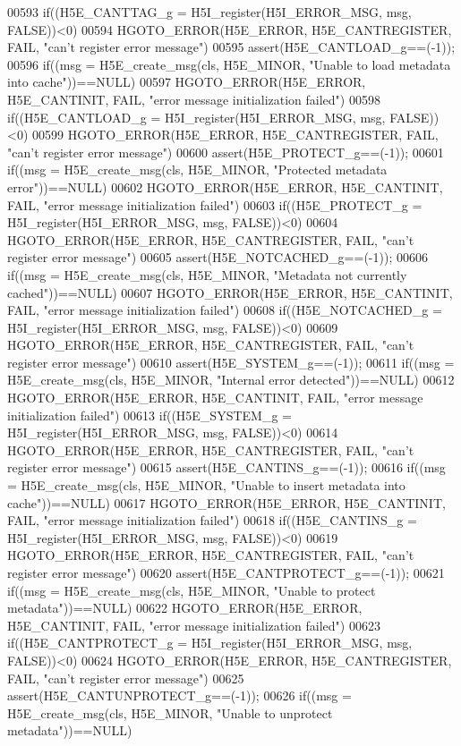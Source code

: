 \begin{DoxyCode}
00593 if((H5E\_CANTTAG\_g = H5I\_register(H5I\_ERROR\_MSG, msg, FALSE))<0)
00594     HGOTO\_ERROR(H5E\_ERROR, H5E\_CANTREGISTER, FAIL, "can't register error message")
00595 assert(H5E\_CANTLOAD\_g==(-1));
00596 if((msg = H5E\_create\_msg(cls, H5E\_MINOR, "Unable to load metadata into cache"))==NULL)
00597     HGOTO\_ERROR(H5E\_ERROR, H5E\_CANTINIT, FAIL, "error message initialization failed")
00598 if((H5E\_CANTLOAD\_g = H5I\_register(H5I\_ERROR\_MSG, msg, FALSE))<0)
00599     HGOTO\_ERROR(H5E\_ERROR, H5E\_CANTREGISTER, FAIL, "can't register error message")
00600 assert(H5E\_PROTECT\_g==(-1));
00601 if((msg = H5E\_create\_msg(cls, H5E\_MINOR, "Protected metadata error"))==NULL)
00602     HGOTO\_ERROR(H5E\_ERROR, H5E\_CANTINIT, FAIL, "error message initialization failed")
00603 if((H5E\_PROTECT\_g = H5I\_register(H5I\_ERROR\_MSG, msg, FALSE))<0)
00604     HGOTO\_ERROR(H5E\_ERROR, H5E\_CANTREGISTER, FAIL, "can't register error message")
00605 assert(H5E\_NOTCACHED\_g==(-1));
00606 if((msg = H5E\_create\_msg(cls, H5E\_MINOR, "Metadata not currently cached"))==NULL)
00607     HGOTO\_ERROR(H5E\_ERROR, H5E\_CANTINIT, FAIL, "error message initialization failed")
00608 if((H5E\_NOTCACHED\_g = H5I\_register(H5I\_ERROR\_MSG, msg, FALSE))<0)
00609     HGOTO\_ERROR(H5E\_ERROR, H5E\_CANTREGISTER, FAIL, "can't register error message")
00610 assert(H5E\_SYSTEM\_g==(-1));
00611 if((msg = H5E\_create\_msg(cls, H5E\_MINOR, "Internal error detected"))==NULL)
00612     HGOTO\_ERROR(H5E\_ERROR, H5E\_CANTINIT, FAIL, "error message initialization failed")
00613 if((H5E\_SYSTEM\_g = H5I\_register(H5I\_ERROR\_MSG, msg, FALSE))<0)
00614     HGOTO\_ERROR(H5E\_ERROR, H5E\_CANTREGISTER, FAIL, "can't register error message")
00615 assert(H5E\_CANTINS\_g==(-1));
00616 if((msg = H5E\_create\_msg(cls, H5E\_MINOR, "Unable to insert metadata into cache"))==NULL)
00617     HGOTO\_ERROR(H5E\_ERROR, H5E\_CANTINIT, FAIL, "error message initialization failed")
00618 if((H5E\_CANTINS\_g = H5I\_register(H5I\_ERROR\_MSG, msg, FALSE))<0)
00619     HGOTO\_ERROR(H5E\_ERROR, H5E\_CANTREGISTER, FAIL, "can't register error message")
00620 assert(H5E\_CANTPROTECT\_g==(-1));
00621 if((msg = H5E\_create\_msg(cls, H5E\_MINOR, "Unable to protect metadata"))==NULL)
00622     HGOTO\_ERROR(H5E\_ERROR, H5E\_CANTINIT, FAIL, "error message initialization failed")
00623 if((H5E\_CANTPROTECT\_g = H5I\_register(H5I\_ERROR\_MSG, msg, FALSE))<0)
00624     HGOTO\_ERROR(H5E\_ERROR, H5E\_CANTREGISTER, FAIL, "can't register error message")
00625 assert(H5E\_CANTUNPROTECT\_g==(-1));
00626 if((msg = H5E\_create\_msg(cls, H5E\_MINOR, "Unable to unprotect metadata"))==NULL)

\end{DoxyCode}
